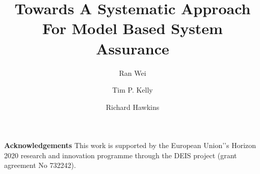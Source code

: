 \documentclass[runningheads,a4paper]{llncs}
\begin{document}
 
\title{\textbf{Towards A Systematic Approach For Model Based System Assurance}}
\author{Ran Wei \and Tim P. Kelly \and Richard Hawkins}
\maketitle



















\noindent\textbf{Acknowledgements}
This work is supported by the European Union'’s Horizon 2020 research and innovation programme through the DEIS project (grant agreement No 732242). 

 
  
\end{document}
